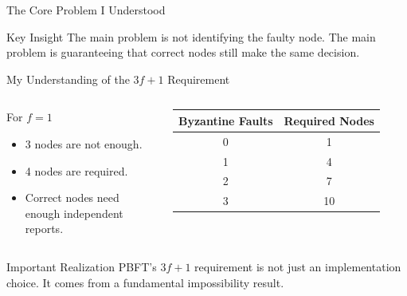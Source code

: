 \documentclass[aspectratio=169]{beamer}
\begin{document}
\begin{frame}{The Core Problem I Understood}
\begin{center}
\end{center}

\begin{alertblock}{Key Insight}
The main problem is not identifying the faulty node.  
The main problem is guaranteeing that correct nodes still make the same decision.
\end{alertblock}
\end{frame}

\begin{frame}{My Understanding of the \(3f+1\) Requirement}
\begin{columns}
\begin{block}{For \(f=1\)}
\begin{itemize}
  \item 3 nodes are not enough.
  \item 4 nodes are required.
  \item Correct nodes need enough independent reports.
\end{itemize}
\end{block}

\begin{table}
\centering
\begin{tabular}{cc}
\toprule
Byzantine Faults & Required Nodes \\
\midrule
0 & 1 \\
1 & 4 \\
2 & 7 \\
3 & 10 \\
\bottomrule
\end{tabular}
\end{table}
\end{columns}

\vspace{0.4cm}

\begin{alertblock}{Important Realization}
PBFT's \(3f+1\) requirement is not just an implementation choice.  
It comes from a fundamental impossibility result.
\end{alertblock}
\end{frame}
\end{document}
